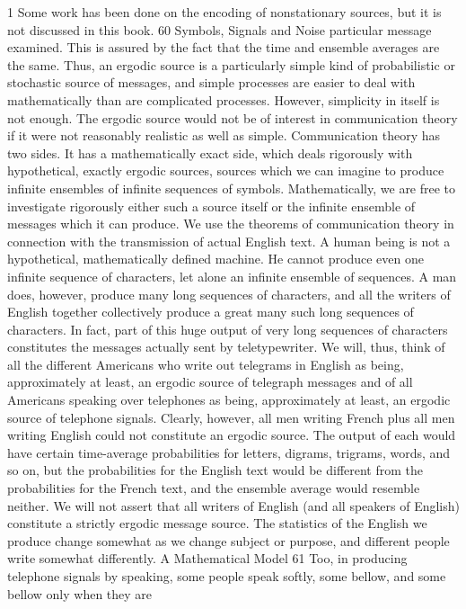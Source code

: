 1 Some work has been done on the encoding of nonstationary sources, but it is
not discussed in this book.
60
Symbols, Signals and Noise
particular message examined. This is assured by the fact that the
time and ensemble averages are the same.
Thus, an ergodic source is a particularly simple kind of probabilistic
or stochastic source of messages, and simple processes are
easier to deal with mathematically than are complicated processes.
However, simplicity in itself is not enough. The ergodic source
would not be of interest in communication theory if it were not
reasonably realistic as well as simple.
Communication theory has two sides. It has a mathematically
exact side, which deals rigorously with hypothetical, exactly ergodic
sources, sources which we can imagine to produce infinite ensembles
of infinite sequences of symbols. Mathematically, we are
free to investigate rigorously either such a source itself or the
infinite ensemble of messages which it can produce.
We use the theorems of communication theory in connection
with the transmission of actual English text. A human being is not
a hypothetical, mathematically defined machine. He cannot produce
even one infinite sequence of characters, let alone an infinite
ensemble of sequences.
A man does, however, produce many long sequences of characters,
and all the writers of English together collectively produce a
great many such long sequences of characters. In fact, part of this
huge output of very long sequences of characters constitutes the
messages actually sent by teletypewriter.
We will, thus, think of all the different Americans who write out
telegrams in English as being, approximately at least, an ergodic
source of telegraph messages and of all Americans speaking over
telephones as being, approximately at least, an ergodic source of
telephone signals. Clearly, however, all men writing French plus
all men writing English could not constitute an ergodic source. The
output of each would have certain time-average probabilities for
letters, digrams, trigrams, words, and so on, but the probabilities
for the English text would be different from the probabilities for
the French text, and the ensemble average would resemble neither.
We will not assert that all writers of English (and all speakers
of English) constitute a strictly ergodic message source. The statistics
of the English we produce change somewhat as we change
subject or purpose, and different people write somewhat differently.
A Mathematical Model 61
Too, in producing telephone signals by speaking, some people
speak softly, some bellow, and some bellow only when they are
